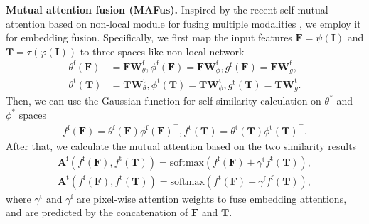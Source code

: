 \documentclass[10pt,twocolumn,letterpaper]{article}
\renewcommand{\paragraph}[1]{\vspace{1.25mm}\noindent\textbf{#1}}
\begin{document}
\paragraph{Mutual attention fusion (MAFus).} 
Inspired by the recent self-mutual attention based on non-local module \cite{wang2018non} for fusing multiple modalities \cite{liu2020learning}, we employ it for embedding fusion. Specifically, we first map the input features $\mathbf{F}=\psi(\mathbf{I})$ and $\mathbf{T}=\tau(\varphi(\mathbf{I}))$ to three spaces like non-local network
%
\begin{align}\label{eq:nonlocal-1}
\theta^\text{f}(\mathbf{F}) & = \mathbf{F}\mathbf{W}_{\theta}^\text{f},
\phi^\text{f}(\mathbf{F}) = \mathbf{F}\mathbf{W}_{\phi}^\text{f},
g^\text{f}(\mathbf{F}) = \mathbf{F}\mathbf{W}_{g}^\text{f}, \\
\theta^\text{t}(\mathbf{T}) & = \mathbf{T}\mathbf{W}_{\theta}^\text{t},
\phi^\text{t}(\mathbf{T}) = \mathbf{T}\mathbf{W}_{\phi}^\text{t},
g^\text{t}(\mathbf{T}) = \mathbf{T}\mathbf{W}_{g}^\text{t}.
\end{align}
%
Then, we can use the Gaussian function for self similarity calculation on $\theta^*$ and $\phi^*$ spaces
%
\begin{align}\label{eq:nonlocal-2}
f^\text{f}(\mathbf{F})=\theta^\text{f}(\mathbf{F})\phi^\text{f}(\mathbf{F})^{\top}, f^\text{t}(\mathbf{T})=\theta^\text{t}(\mathbf{T})\phi^\text{t}(\mathbf{T})^{\top}.
\end{align}
%
After that, we calculate the mutual attention based on the two similarity results
%
\begin{align}\label{eq:nonlocal-3}
\mathbf{A}^\text{f}(f^\text{f}(\mathbf{F}),f^\text{t}(\mathbf{T}))=\text{softmax}(f^\text{f}(\mathbf{F})+\gamma^\text{t}f^\text{t}(\mathbf{T})),\\
\mathbf{A}^\text{t}(f^\text{f}(\mathbf{F}),f^\text{t}(\mathbf{T}))=\text{softmax}(f^\text{t}(\mathbf{F})+\gamma^\text{f}f^\text{f}(\mathbf{T})),
\end{align}
%
where $\gamma^\text{t}$ and $\gamma^\text{f}$ are pixel-wise attention weights to fuse embedding attentions, and are predicted by the concatenation of $\mathbf{F}$ and $\mathbf{T}$.
\end{document}
